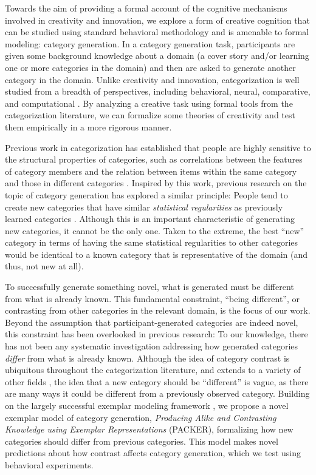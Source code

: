 \documentclass[12pt]{article}
\begin{document}
\begin{flushleft}
Towards the aim of providing a formal account of the cognitive mechanisms involved in creativity and innovation, we explore a form of creative cognition that can be studied using standard behavioral methodology and is amenable to formal modeling: category generation. In a category generation task, participants are given some background knowledge about a domain (a cover story and/or learning one or more categories in the domain) and then are asked to generate another category in the domain. Unlike creativity and innovation, categorization is well studied from a breadth of perspectives, including behavioral, neural, comparative, and computational  \citep{kurtz2015human,mack2013,margolis2015,pothoswills2011}. By analyzing a creative task using formal tools from the categorization literature, we can formalize some theories of creativity and test them empirically in a more rigorous manner. 

Previous work in categorization has established that people are highly sensitive to the structural properties of categories, such as correlations between the features of category members and the relation between items within the same category and those in different categories \citep{roschmervis1975,regier2007,shepard1961learning}. Inspired by this work, previous research on the topic of category generation has explored a similar principle: People tend to create new categories that have similar {\em statistical regularities} as previously learned categories \citep{jern2013probabilistic,ward1994structured}. Although this is an important characteristic of generating new categories, it cannot be the only one. Taken to the extreme, the best ``new'' category in terms of having the same statistical regularities to other categories would be identical to a known category that is representative of the domain (and thus, not new at all). 

To successfully generate something novel, what is generated must be different from what is already known. This fundamental constraint, ``being different'', or contrasting from other categories in the relevant domain, is the focus of our work. Beyond the assumption that participant-generated categories are indeed novel, this constraint has been overlooked in previous research: To our knowledge, there has not been any systematic investigation addressing how generated categories {\em differ} from what is already known. Although the idea of category contrast is ubiquitous throughout the categorization literature, and extends to a variety of other fields \citep[e.g., color;][]{regier2007}, the idea that a new category should be ``different'' is vague, as there are many ways it could be different from a previously observed category. Building on the largely successful exemplar modeling framework \citep{medin1978context,nosofsky1984choice,nosofsky1986attention}, we propose a novel exemplar model of category generation, {\em Producing Alike and Contrasting Knowledge using Exemplar Representations} (PACKER), formalizing how new categories should differ from previous categories. This model makes novel predictions about how contrast affects category generation, which we test using behavioral experiments.


\end{flushleft}
\end{document}
